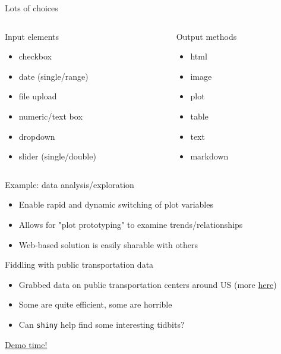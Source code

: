\documentclass[sans,aspectratio=169,presentation,bigger,fleqn]{beamer}
\begin{document}
\begin{frame}[label=sec-6]{Lots of choices}
\begin{columns}
\begin{column}{0.45\textwidth}
\begin{block}{Input elements}
\begin{itemize}
\item checkbox
\item date (single/range)
\item file upload
\item numeric/text box
\item dropdown
\item slider (single/double)
\end{itemize}
\end{block}
\end{column}
\begin{column}{0.45\textwidth}
\begin{block}{Output methods}
\begin{itemize}
\item html
\item image
\item plot
\item table
\item text
\item\relax [rendered] markdown
\end{itemize}
\end{block}
\end{column}
\end{columns}
\end{frame}
\begin{frame}[label=sec-7]{Example: data analysis/exploration}
\begin{itemize}
\item Enable rapid and dynamic switching of plot variables
\item Allows for "plot prototyping" to examine trends/relationships
\item Web-based solution is easily sharable with others
\end{itemize}
\end{frame}
\begin{frame}[fragile,label=sec-8]{Fiddling with public transportation data}
 \begin{itemize}
\item Grabbed data on public transportation centers around US (more \href{https://github.com/tcrug/public-transpo}{here})
\item Some are quite efficient, some are horrible
\item Can \texttt{shiny} help find some interesting tidbits?
\end{itemize}

\pause

\href{http://jwhendy.shinyapps.io/transpo-exploration/}{\alert{Demo time!}}
\end{frame}
\end{document}

